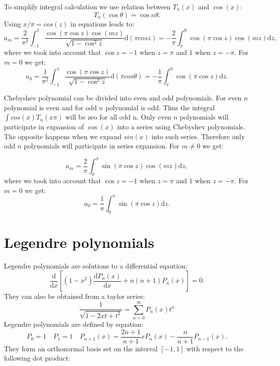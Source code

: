 \documentclass[openany, longbibliography,slovene,a4paper,12pt]{article}
\newcommand{\dif}{\mathrm{d}}
\begin{document}
To simplify integral calculation we use relation between $T_n(x)$ and $\cos(x)$:
\begin{equation}
  T_n(\cos\theta)=\cos n\theta.
\end{equation}
Using $x/\pi = cos(z)$  in equations \label{coeffm} leads to:
\begin{equation}
  a_m = \frac{2}{\pi^2} \int_{-1}^{1}\frac{\cos(\pi\cos z)\cos(mz)}{\sqrt{1-\cos^2z}} \dif (\pi cosz)=-\frac{2}{\pi} \int_{\pi}^{0}\cos(\pi\cos z)\cos(mz) \dif z, 
  \end{equation}
where we took into account that $\cos z = -1$ when $z=\pi$ and $1$ when $z=-\pi$.
  For $m=0$ we get:
  \begin{equation}
    a_0 = \frac{1}{\pi^2} \int_{-1}^{1}\frac{\cos(\pi\cos z)}{\sqrt{1-\cos^2z}} \dif (\pi cos\theta)=-\frac{1}{\pi} \int_{\pi}^{0}\cos(\pi\cos z) \dif z.
  \end{equation}

  Chebyshev polynomial can be divided into even and odd polynomials. For even
  $n$ polynomial is even and for odd $n$ polynomial is odd. Thus the integral
  $\int cos(x) T_n(x\pi)$ will be zeo for all odd n. Only even $n$ polynomials
  will participate in expansion of $\cos(x)$ into a series using Chebyshev
  polynomials.
  The opposite happens when we expand $sin(x)$ into such series. Therefore only odd
  $n$ polynomials will participate in series expansion. For $m\neq0$ we get:

\begin{equation}
  a_m = \frac{2}{\pi} \int_{0}^{\pi}\sin(\pi\cos z)\cos(mz) \dif z, 
  \end{equation}
where we took into account that $\cos z = -1$ when $z=\pi$ and $1$ when $z=-\pi$.
  For $m=0$ we get:
  \begin{equation}
    a_0 = \frac{1}{\pi} \int_{0}^{\pi}\sin(\pi\cos z) \dif z.
  \end{equation}

\section{Legendre polynomials}
Legendre polynomials are solutions to a differential eqaution:
\begin{equation}
  \frac{\dif}{\dif x}\left[ (1-x^2)\frac{\dif P_n(x)}{\dif x} + n(n+1)P_n(x) \right] =0.
\end{equation}
They can also be obtained from a taylor series:
\begin{equation}
  \frac{1}{\sqrt{1-2xt+t^2}}=\sum_{n=0}^{\infty} P_n(x)t^n
  \end{equation}
Legendre polynomials are defined by equation:
\begin{equation}
  P_0 = 1 \quad P_1=1 \quad P_{n+1}(x)=\frac{2n+1}{n+1}xP_{n}(x) -  \frac{n}{n+1}P_{n-1}(x).
\end{equation}
They form an orthonormal basis set on the interval $[-1,1]$ with respect to the
following dot product:
\end{document}
